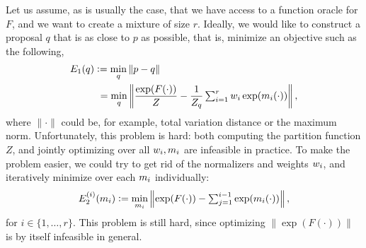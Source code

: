 Let us assume, as is usually the case, that we have access to a function oracle for $F$, and we want to create a mixture of size $r$.
Ideally, we would like to construct a proposal $q$ that is as close to $p$ as possible, that is, minimize an objective such as the following,
\begin{align*}
  E_1(q) &\vcentcolon= \min_q \| p - q \|\\
         &\,\,= \min_q \left\| \frac{\exp(F(\cdot))}{Z} - \frac{1}{Z_q}\textstyle\sum_{i = 1}^r w_i\exp(m_i(\cdot)) \right\|,
\end{align*}
where $\| \cdot \|$ could be, for example, total variation distance or the maximum norm.
Unfortunately, this problem is hard: both computing the partition function $Z$, and jointly optimizing over all $w_i, m_i$ are infeasible in practice.
To make the problem easier, we could try to get rid of the normalizers and weights $w_i$, and iteratively minimize over each $m_i$ individually:
\begin{align*}
  E_2^{(i)}(m_i) \vcentcolon= \min_{m_i} \left\| \exp(F(\cdot)) - \textstyle\sum_{j = 1}^{i-1} \exp(m_i(\cdot)) \right\|,
\end{align*}
for $i \in \{1, \ldots, r\}$.
This problem is still hard, since optimizing $\| \exp(F(\cdot)) \|$ is by itself infeasible in general.



